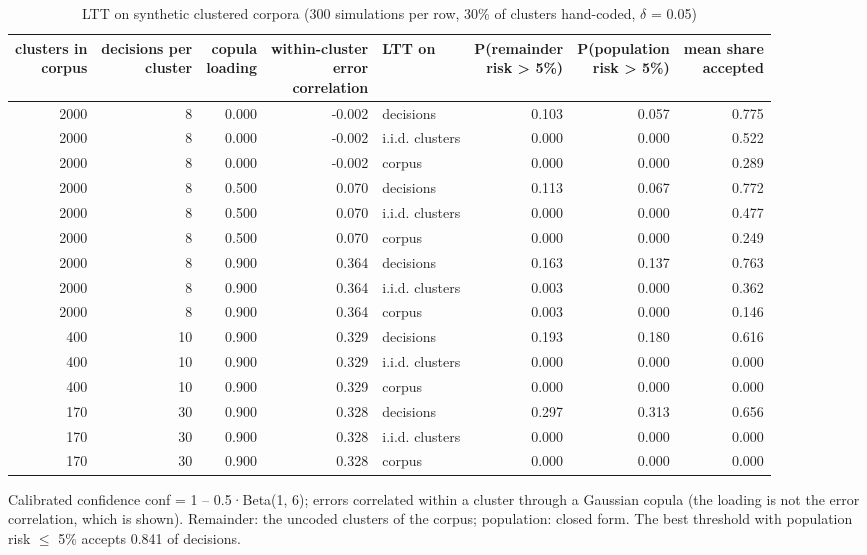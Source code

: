 \begin{table}[t]
\centering
\small
\caption{LTT on synthetic clustered corpora (300 simulations per row, 30\% of clusters hand-coded, $\delta$ = 0.05)}
\label{tab:tab20_ltt_simulation}
\begin{adjustbox}{max width=\linewidth}
\begin{tabular}{rrrrlrrr}
\toprule
\makecell[br]{clusters in \\{} corpus} & \makecell[br]{decisions per \\{} cluster} & \makecell[br]{copula \\{} loading} & \makecell[br]{within-cluster \\{} error \\{} correlation} & LTT on & \makecell[br]{P(remainder \\{} risk > 5\%)} & \makecell[br]{P(population \\{} risk > 5\%)} & \makecell[br]{mean share \\{} accepted} \\
\midrule
2000 & 8 & 0.000 & -0.002 & decisions & 0.103 & 0.057 & 0.775 \\
2000 & 8 & 0.000 & -0.002 & i.i.d. clusters & 0.000 & 0.000 & 0.522 \\
2000 & 8 & 0.000 & -0.002 & corpus & 0.000 & 0.000 & 0.289 \\
2000 & 8 & 0.500 & 0.070 & decisions & 0.113 & 0.067 & 0.772 \\
2000 & 8 & 0.500 & 0.070 & i.i.d. clusters & 0.000 & 0.000 & 0.477 \\
2000 & 8 & 0.500 & 0.070 & corpus & 0.000 & 0.000 & 0.249 \\
2000 & 8 & 0.900 & 0.364 & decisions & 0.163 & 0.137 & 0.763 \\
2000 & 8 & 0.900 & 0.364 & i.i.d. clusters & 0.003 & 0.000 & 0.362 \\
2000 & 8 & 0.900 & 0.364 & corpus & 0.003 & 0.000 & 0.146 \\
400 & 10 & 0.900 & 0.329 & decisions & 0.193 & 0.180 & 0.616 \\
400 & 10 & 0.900 & 0.329 & i.i.d. clusters & 0.000 & 0.000 & 0.000 \\
400 & 10 & 0.900 & 0.329 & corpus & 0.000 & 0.000 & 0.000 \\
170 & 30 & 0.900 & 0.328 & decisions & 0.297 & 0.313 & 0.656 \\
170 & 30 & 0.900 & 0.328 & i.i.d. clusters & 0.000 & 0.000 & 0.000 \\
170 & 30 & 0.900 & 0.328 & corpus & 0.000 & 0.000 & 0.000 \\
\bottomrule
\end{tabular}
\end{adjustbox}
\par\smallskip\footnotesize\raggedright Calibrated confidence conf = 1 -- 0.5·Beta(1, 6); errors correlated within a cluster through a Gaussian copula (the loading is not the error correlation, which is shown). Remainder: the uncoded clusters of the corpus; population: closed form. The best threshold with population risk $\leq$ 5\% accepts 0.841 of decisions.
\end{table}
